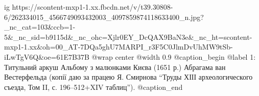 
 
 
 
 

\ifcmt
  ig https://scontent-mxp1-1.xx.fbcdn.net/v/t39.30808-6/262334015_4566749093432003_4097859874118633400_n.jpg?_nc_cat=103&ccb=1-5&_nc_sid=b9115d&_nc_ohc=Xjlr0EY_DcQAX9BaN3e&_nc_ht=scontent-mxp1-1.xx&oh=00_AT-7DQa5ghU7MARPI_r3F5C0JlmDvUhMW9tSb-iLwTgV6Q&oe=61E7B37B
  @wrap center
  @width 0.9
  @caption_begin
    @label 1:
Титульний аркуш Альбому з малюнками Києва (1651 р.) Абрагама ван Вестерфельда
(копії даю за працею Я. Смирнова \enquote{Труды ХІІІ археологического съезда, Том II, с. 196–512+XIV таблиц}).
  @caption_end
\fi
